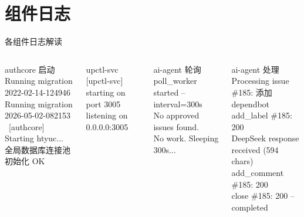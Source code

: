 \documentclass[10pt,aspectratio=169,utf8]{beamer}
\begin{document}
\section{组件日志}

\begin{frame}[fragile]{各组件日志解读}
  \begin{columns}[T]
    \begin{block}{authcore 启动}
      \tiny
      Running migration 2022-02-14-124946\\
      \relax Running migration 2026-05-02-082153\\
      \relax\ [authcore] Starting htyuc...\\
      全局数据库连接池初始化 OK
    \end{block}
    \begin{block}{upctl-svc}
      \tiny
      [upctl-svc] starting on port 3005\\
       listening on 0.0.0.0:3005
    \end{block}

    \begin{block}{ai-agent 轮询}
      \tiny
      poll\_worker started -- interval=300s\\
      No approved issues found.\\
      No work. Sleeping 300s...
    \end{block}
    \begin{block}{ai-agent 处理}
      \tiny
      Processing issue \#185: 添加dependbot\\
      add\_label \#185: 200\\
      DeepSeek response received (594 chars)\\
      add\_comment \#185: 200\\
      close \#185: 200 -- completed
    \end{block}
  \end{columns}
\end{frame}
\end{document}
